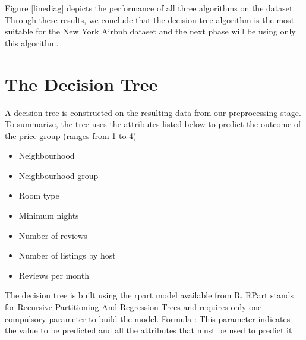 \documentclass{sig-alternate}
\begin{document}
	Figure \ref{linediag} depicts the performance of all three algorithms on the dataset. Through these results, we conclude that the decision tree algorithm is the most suitable for the New York Airbnb dataset and the next phase will be using only this algorithm.
	\section{The Decision Tree} 
	A decision tree is constructed on the resulting data from our preprocessing stage. To summarize, the tree uses the attributes listed below to predict the outcome of the price group (ranges from 1 to 4)
	\begin{itemize}
		\item Neighbourhood
		\item Neighbourhood group
		\item Room type
		\item Minimum nights
		\item Number of reviews
		\item Number of listings by host
		\item Reviews per month
	\end{itemize}
	The decision tree is built using the rpart model available from R. RPart stands for Recursive Partitioning And Regression Trees and requires only one compulsory parameter to build the model. \newline
	Formula : This parameter indicates the value to be predicted and all the attributes that must be used to predict it\newline
\end{document}
